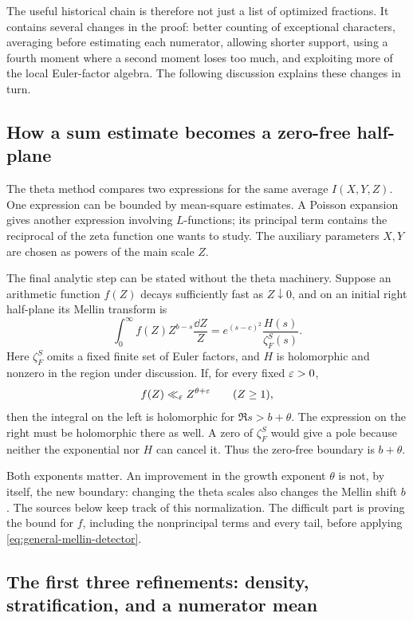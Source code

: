The useful historical chain is therefore not just a list of optimized fractions. It contains several changes in the proof: better counting of exceptional characters, averaging before estimating each numerator, allowing shorter support, using a fourth moment where a second moment loses too much, and exploiting more of the local Euler-factor algebra. The following discussion explains these changes in turn.

\subsection{How a sum estimate becomes a zero-free half-plane}

The theta method compares two expressions for the same average $I(X,Y,Z)$. One expression can be bounded by mean-square estimates. A Poisson expansion gives another expression involving $L$-functions; its principal term contains the reciprocal of the zeta function one wants to study. The auxiliary parameters $X,Y$ are chosen as powers of the main scale $Z$.

The final analytic step can be stated without the theta machinery. Suppose an arithmetic function $f(Z)$ decays sufficiently fast as $Z\downarrow0$, and on an initial right half-plane its Mellin transform is
\begin{equation}\label{eq:general-mellin-detector}
 \int_0^\infty f(Z)Z^{b-s}\frac{\dd Z}{Z}
       =e^{(s-c)^2}\frac{H(s)}{\zeta_F^S(s)}.
\end{equation}
Here $\zeta_F^S$ omits a fixed finite set of Euler factors, and $H$ is holomorphic and nonzero in the region under discussion. If, for every fixed $\varepsilon>0$,
\[
 f(Z)\ll_\varepsilon Z^{\theta+\varepsilon}\qquad(Z\ge1),
\]
then the integral on the left is holomorphic for $\Re s>b+\theta$. The expression on the right must be holomorphic there as well. A zero of $\zeta_F^S$ would give a pole because neither the exponential nor $H$ can cancel it. Thus the zero-free boundary is $b+\theta$.

Both exponents matter. An improvement in the growth exponent $\theta$ is not, by itself, the new boundary: changing the theta scales also changes the Mellin shift $b$. The sources below keep track of this normalization. The difficult part is proving the bound for $f$, including the nonprincipal terms and every tail, before applying \eqref{eq:general-mellin-detector}.

\subsection{The first three refinements: density, stratification, and a numerator mean}

